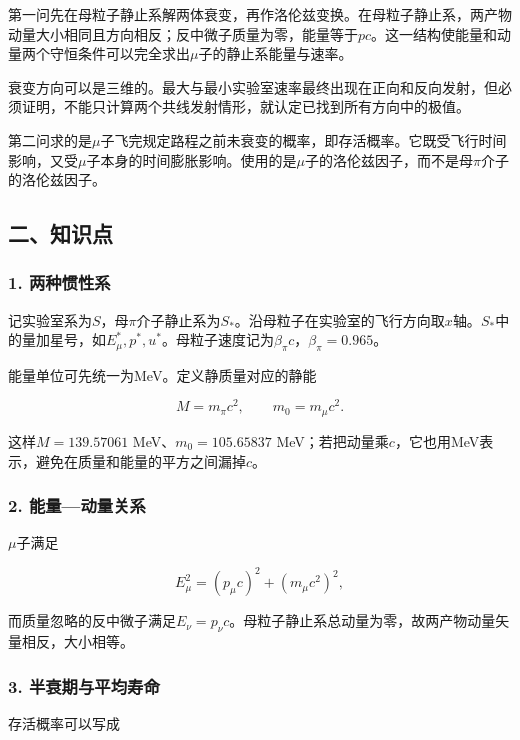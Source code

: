 \documentclass[12pt,a4paper,fontset=fandol]{ctexart}
\begin{document}
第一问先在母粒子静止系解两体衰变，再作洛伦兹变换。在母粒子静止系，两产物动量大小相同且方向相反；反中微子质量为零，能量等于\(pc\)。这一结构使能量和动量两个守恒条件可以完全求出\(\mu\)子的静止系能量与速率。

衰变方向可以是三维的。最大与最小实验室速率最终出现在正向和反向发射，但必须证明，不能只计算两个共线发射情形，就认定已找到所有方向中的极值。

第二问求的是\(\mu\)子飞完规定路程之前未衰变的概率，即存活概率。它既受飞行时间影响，又受\(\mu\)子本身的时间膨胀影响。使用的是\(\mu\)子的洛伦兹因子，而不是母\(\pi\)介子的洛伦兹因子。

\subsection{二、知识点}\label{ux4e8cux77e5ux8bc6ux70b9-5}

\subsubsection{1. 两种惯性系}\label{ux4e24ux79cdux60efux6027ux7cfb}

记实验室系为\(S\)，母\(\pi\)介子静止系为\(S_*\)。沿母粒子在实验室的飞行方向取\(x\)轴。\(S_*\)中的量加星号，如\(E_\mu^*,p^*,u^*\)。母粒子速度记为\(\beta_\pi c\)，\(\beta_\pi=0.965\)。

能量单位可先统一为MeV。定义静质量对应的静能

\[
M=m_\pi c^2,\qquad m_0=m_\mu c^2.
\]

这样\(M=139.57061\) MeV、\(m_0=105.65837\)
MeV；若把动量乘\(c\)，它也用MeV表示，避免在质量和能量的平方之间漏掉\(c\)。

\subsubsection{2.
能量---动量关系}\label{ux80fdux91cfux52a8ux91cfux5173ux7cfb}

\(\mu\)子满足

\[
E_\mu^2=(p_\mu c)^2+(m_\mu c^2)^2,
\]

而质量忽略的反中微子满足\(E_\nu=p_\nu c\)。母粒子静止系总动量为零，故两产物动量矢量相反，大小相等。

\subsubsection{3.
半衰期与平均寿命}\label{ux534aux8870ux671fux4e0eux5e73ux5747ux5bffux547d}

存活概率可以写成
\end{document}

